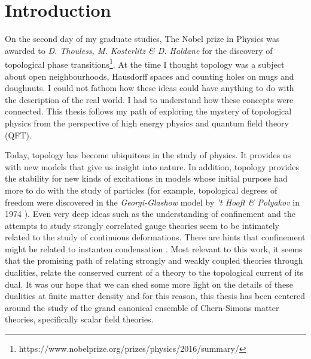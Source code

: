 
    \graphicspath{{Introduction_Folder/figures/PNG/}{Introduction_Folder/figures/PDF/}{Introduction_Folder/figures/}}

\chapter*{Introduction}


On the second day of my graduate studies, The Nobel prize in Physics was awarded to \textit{D. Thouless, M. Kosterlitz \& D. Haldane} for the discovery of topological phase transitions\footnote{https://www.nobelprize.org/prizes/physics/2016/summary/}. At the time I thought topology was a subject about open neighbourhoods, Hausdorff spaces and counting holes on mugs and doughnuts. I could not fathom how these ideas could have anything to do with the description of the real world. I had to understand how these concepts were connected. This thesis follows my path of exploring the mystery of topological physics from the perspective of high energy physics and quantum field theory (QFT).

Today, topology has become ubiquitous in the study of physics. It provides us with new models that give us insight into nature. In addition, topology provides the stability for new kinds of excitations in models whose initial purpose had more to do with the study of particles (for example, topological degrees of freedom were discovered in the \textit{Georgi-Glashow} model \cite{Georgi:1974sy} by \textit{'t Hooft \& Polyakov} in 1974 \cite{Polyakov:1974ek, tHooft:1974kcl}). Even very deep ideas such as the understanding of confinement and the attempts to study strongly correlated gauge theories seem to be intimately related to the study of continuous deformations. There are hints that confinement might be related to instanton condensation \cite{Polyakov:1976fu}. Most relevant to this work, it seems that the promising path of relating strongly and weakly coupled theories through dualities, relate the conserved current of a theory to the topological current of its dual. It was our hope that we can shed some more light on the details of these dualities at finite matter density and for this reason, this thesis has been centered around the study of the grand canonical ensemble of Chern-Simons matter theories, specifically scalar field theories.

